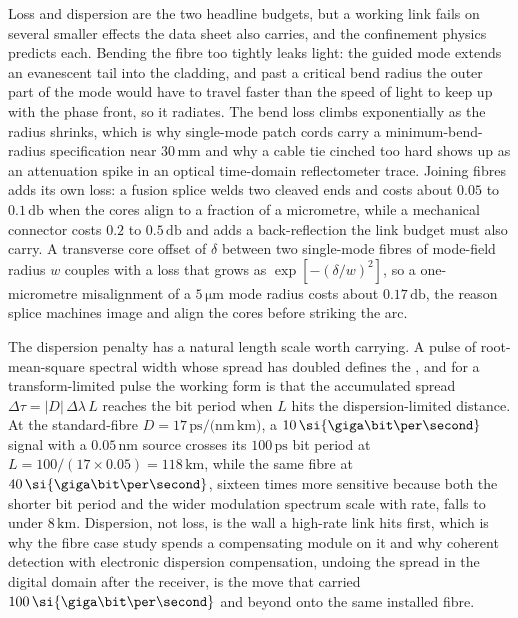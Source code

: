 Loss and dispersion are the two headline budgets, but a working link fails on
several smaller effects the data sheet also carries, and the confinement physics
predicts each. Bending the fibre too tightly leaks light: the guided mode extends
an evanescent tail into the cladding, and past a critical bend radius the outer
part of the mode would have to travel faster than the speed of light to keep up
with the phase front, so it radiates. The bend loss climbs exponentially as the
radius shrinks, which is why single-mode patch cords carry a minimum-bend-radius
specification near $30\,\si{\milli\meter}$ and why a cable tie cinched too hard
shows up as an attenuation spike in an optical time-domain reflectometer trace.
Joining fibres adds its own loss: a fusion splice welds two cleaved ends and costs
about $0.05$ to $0.1\,\si{\decibel}$ when the cores align to a fraction of a
micrometre, while a mechanical connector costs $0.2$ to $0.5\,\si{\decibel}$ and
adds a back-reflection the link budget must also carry. A transverse core offset of
$\delta$ between two single-mode fibres of mode-field radius $w$ couples with a loss
that grows as $\exp[-(\delta/w)^2]$, so a one-micrometre misalignment of a
$5\,\si{\micro\meter}$ mode radius costs about $0.17\,\si{\decibel}$, the reason
splice machines image and align the cores before striking the arc.

The dispersion penalty has a natural length scale worth carrying. A pulse of
root-mean-square spectral width whose spread has doubled defines the
, and for a transform-limited pulse the working form is
that the accumulated spread $\Delta\tau = |D|\,\Delta\lambda\,L$ reaches the bit
period when $L$ hits the dispersion-limited distance. At the standard-fibre
$D = 17\,\si{\pico\second/(\nano\meter\,\kilo\meter)}$, a
$10\,\si{\giga\bit\per\second}$ signal with a $0.05\,\si{\nano\meter}$ source
crosses its $100\,\si{\pico\second}$ bit period at
$L = 100/(17\times 0.05) = 118\,\si{\kilo\meter}$, while the same fibre at
$40\,\si{\giga\bit\per\second}$, sixteen times more sensitive because both the
shorter bit period and the wider modulation spectrum scale with rate, falls to
under $8\,\si{\kilo\meter}$. Dispersion, not loss, is the wall a high-rate link
hits first, which is why the fibre case study spends a compensating module on it
and why coherent detection with electronic dispersion compensation, undoing the
spread in the digital domain after the receiver, is the move that carried
$100\,\si{\giga\bit\per\second}$ and beyond onto the same installed fibre.

